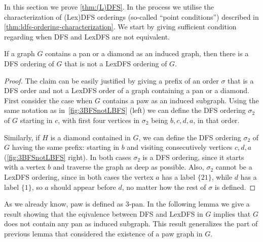 \documentclass{svproc}
\begin{document}
In this section we prove \cref{thm:(L)DFS}.
In the process we utilise the characterization of (Lex)DFS orderings (so-called ``point conditions'') described in \cref{thm:ldfs-ordering-characterization}. 
We start by giving sufficient condition regarding when DFS and LexDFS are not equivalent.
\begin{lemma}
If a graph $G$ contains a pan or a diamond as an induced graph, 
then there is a DFS ordering of $G$ that is not a LexDFS ordering of $G$.
\end{lemma}
\begin{proof}
The claim can be easily justified by giving a prefix of an order $\sigma$ that is a DFS order and not a LexDFS order of a graph containing a pan or a diamond.
First consider the case when $G$ contains a paw as an induced subgraph. Using the same notation as in~\cref{fig:3BFSnotLBFS} (left) we can define the DFS ordering $\sigma_2$ of $G$ starting in $c$, with first four vertices in $\sigma_2$ being $b,c,d,a$, in that order. 

Similarly, if $H$ is a diamond contained in $G$, we can define the DFS ordering $\sigma_2$ of $G$ having the same prefix: starting in $b$ and visiting consecutively vertices $c,d,a$ (\cref{fig:3BFSnotLBFS} right). In both cases $\sigma_2 $ is a DFS ordering, since it starts with a vertex $b$ and traverse the graph as deep as possible.
Also, $\sigma_2$ cannot be a LexDFS ordering, since in both cases the vertex $a$ has a label $\{21\}$, while $d$ has a label $\{1\}$, so $a$ should appear before $d$, no matter how the rest of $\sigma$ is defined. 
\end{proof}

As we already know, paw is defined as $3$-pan. In the following lemma we give a result showing that the eqivalence between DFS and LexDFS in $G$ implies that $G$ does not contain any pan as induced subgraph. This result generalizes the part of previous lemma that considered the existence of a paw graph in $G$. 
\end{document}
